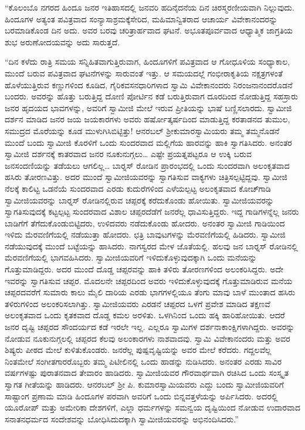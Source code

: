  “ಕೊಲಂಬೊ ನಗರದ ಹಿಂದೂ ಜನರ ಇತಿಹಾಸದಲ್ಲಿ ಜನವರಿ ಹದಿನೈದನೆಯ ದಿನ ಚಿರಸ್ಮರಣೀಯವಾಗಿ ನಿಲ್ಲುವುದು. ಹಿಂದೂಗಳ ಅತ್ಯಂತ ಪವಿತ್ರವಾದ ಸಂನ್ಯಾಸಾಶ್ರಮಕ್ಕೆ\break ಸೇರಿದ, ಮಹಿಮಾನ್ವಿತರಾದ ಆಚಾರ್ಯ ವಿವೇಕಾನಂದರನ್ನು ಬರಮಾಡಿಕೊಂಡ ದಿನ ಅದು. ಅವರ ಬರವು ಚರಿತ್ರಾರ್ಹವಾದ ಘಟನೆ. ಅಭೂತಪೂರ್ವವಾದ ಆಧ್ಯಾತ್ಮಿಕ ಜಾಗ್ರತಿಯ ಶುಭ ಅರುಣೋದಯವನ್ನು ಅದು ಸಾರುತ್ತದೆ. 

 “ದಿನ ಕಳೆದು ರಾತ್ರಿ ಸಮಯ ಸನ್ನಿಹಿತವಾಗುತ್ತಿರುವಾಗ, ಹಿಂದೂಗಳಿಗೆ ಪವಿತ್ರವಾದ ಆ ಗೋಧೂಳಿಯ ಸಂಧ್ಯಾಕಾಲ, ಮುಂದೆ ಬರುವ ಪವಿತ್ರವಾದ ಘಟನೆಗಳನ್ನು ಸಾರುವಂತೆ ಇತ್ತು. ಆ ಸಮಯದಲ್ಲೆ ಗಂಭೀರಾಕೃತಿಯ ನಕ್ಷತ್ರಗಳಂತೆ ಹೊಳೆಯುತ್ತಿರುವ ಕಣ್ಣುಗಳಿಂದ ಕೂಡಿದ, ಗೈರಿಕವಸನಧಾರಿಗಳಾದ ಸ್ವಾಮಿ ವಿವೇಕಾನಂದರು ನಿರಂಜನಾನಂದರೊಡನೆ ಬಂದರು. ಅವರನ್ನು ಹೊತ್ತು ಬರುತ್ತಿದ್ದ ದೋಣಿ ಪೋರ್ಟಿನ ಕಡೆ ಬರುತ್ತಿರುವಾಗ ದೂರದಿಂದ ನೋಡುತ್ತಿದ್ದ ಸಹಸ್ರಾರು ಜನರ ಹೃದಯದ ಭಾವಗಳನ್ನು, ಅವರಿಗೆ ಸ್ವಾಮೀಜಿ ಮೇಲೆ ಇರುವ ಪ್ರೀತಿಯನ್ನು ಭಾಷೆ ಬಣ್ಣಿಸಲಾರದು. ಸ್ವಾಮೀಜಿ ದರ್ಶನ ಮಾಡಿದ ಜನರ ಜಯ ಜಯಕಾರಗಳು ಅವರು ಹರ್ಷೋತ್ಕರ್ಷದಿಂದ ಮಾಡುತ್ತಿದ್ದ ಕರತಾಡನದ ತುಮುಲ, ಸಮುದ್ರದ ಮೊರೆಯನ್ನು ಕೂಡ ಮುಳುಗಿಸಿಬಿಟ್ಟಿತ್ತು! ಆನರಬಲ್ ಶ‍್ರೀಕುಮಾರಸ್ವಾಮಿಯರು ತಮ್ಮ ತಮ್ಮನೊಡನೆ ಮುಂದೆ ಬಂದು ಸ್ವಾಮೀಜಿ ಕೊರಳಿಗೆ ಒಂದು ಸುಂದರವಾದ ಮಲ್ಲಿಗೆಯ ಹಾರವನ್ನು ಹಾಕಿ ಸ್ವಾಗತಿಸಿದರು. ಅನಂತರ ಸ್ವಾಮೀಜಿ ದರ್ಶನಕ್ಕೆ ಕಾತರವಾದ ಜನರ ನೂಕುನುಗ್ಗಲು… ಎಷ್ಟೇ ಪ್ರಯತ್ನಪಟ್ಟರೂ ಆ ಉಕ್ಕಿ ಬರುವ ಜನಸಂದಣಿಯನ್ನು ತಡೆಯಲು ಆಗಲಿಲ್ಲ… ಬಾರ್‍ನಸ್ ರೋಡಿನ ಪ್ರಾರಂಭದಲ್ಲಿ ಒಂದು ಸುಂದರವಾಗಿ ಅಲಂಕೃತವಾದ ಹಸಿರು ತೋರಣವಿತ್ತು. ಅದರ ಮುಂದೆ ಸ್ವಾಮೀಜಿಯವರನ್ನು ಸ್ವಾಗತಿಸುವ ವಾಕ್ಯಗಳು ಚಿತ್ರಿಸಲ್ಪಟ್ಟಿದ್ದವು. ಸ್ವಾಮೀಜಿ ನೆಲಕ್ಕೆ ಕಾಲಿಟ್ಟ ಒಡನೆಯೆ ಸುಂದರವಾದ ಎರಡು ಕುದುರೆಗಳಿಂದ ಎಳೆಯಲ್ಪಟ್ಟ ಅಲಂಕೃತವಾದ ಕೋಚ್‍ಗಾಡಿ ಸ್ವಾಮೀಜಿಯವರನ್ನು ಬಾರ್‍ನಸ್ ರೋಡಿನಲ್ಲಿರುವ ಚಪ್ಪರಕ್ಕೆ ಕರೆದುಕೊಂಡು ಹೋಯಿತು. ಸ್ವಾಮೀಜಿಯವರನ್ನು ಸ್ವಾಗತಿಸುವುದಕ್ಕೆ ಕಟ್ಟಲ್ಪಟ್ಟ ಸುಂದರವಾದ ವಿಶಾಲ ಚಪ್ಪರದೆಡೆಗೆ ಜನರೆಲ್ಲ ಧಾವಿಸುತ್ತಿದ್ದರು. ಇದ್ದ ಗಾಡಿಗಳನ್ನೆಲ್ಲ ಜನರು ಬಾಡಿಗೆಗೆ ತೆಗೆದುಕೊಂಡುಬಿಟ್ಟಿದರು, ಉಳಿದವರು ನಡೆದುಕೊಂಡು ಹೋದರು. ಅನಂತರ ಸ್ವಾಮೀಜಿ ಗಾಡಿಯಿಂದ ಇಳಿದು ಮೆರವಣಿಗೆಯಲ್ಲಿ ನಡೆಯುತ್ತಾ ಹೋದರು. ಛತ್ರಿ ಬಾವುಟಗಳನ್ನು ಮೆರವಣಿಗೆಯಲ್ಲಿ ಹಿಡಿದರು. ಸ್ವಾಮೀಜಿ ನಡೆಯುವುದಕ್ಕೆ ಮುಂದೆ ಬಟ್ಟೆಯನ್ನು ಹಾಸಿದರು. ನಾಗಸ್ವರದ ಮೇಳ ಜೊತೆಯಲ್ಲಿ. ಹಲವು ಜನ ಬಾರ್‍ನಸ್ ರೋಡಿನಲ್ಲಿ ಮೆರವಣಿಗೆಯಲ್ಲಿ ಭಾಗವಹಿಸಿದರು. ಸ್ವಾಮೀಜಿಯವರಿಗೆ ಇಳಿದುಕೊಳ್ಳುವುದಕ್ಕಾಗಿ ಒಂದು ಮನೆಯನ್ನು ಗೊತ್ತುಮಾಡಿದ್ದರು. ಅದರ ಮುಂದೆ ದೊಡ್ಡ ಚಪ್ಪರವನ್ನು ಹಾಕಿ ತಳಿರು ತೋರಣಗಳಿಂದ ಅಲಂಕರಿಸಿದ್ದರು. ಅದೇ ಇವರನ್ನು ಸ್ವಾಗತಿಸುವ ಚಪ್ಪರ. ಮೊದಲನೇ ಚಪ್ಪರದಿಂದ ಅವರು ಇಳಿದುಕೊಳ್ಳುವುದಕ್ಕೆ ಗೊತ್ತುಮಾಡಿರುವ ಮನೆಯ ಚಪ್ಪರದವರೆಗೆ ಸುಮಾರು ಕಾಲು ಮೈಲಿ ದಾರಿಯ ಎರಡು ಭಾಗಗಳಲ್ಲಿಯೂ ತೆಂಗು ಮಾವು ಬಾಳೆ ಮುಂತಾದ ಹಸಿರು ತಳಿರುಗಳಿಂದ ಅಲಂಕರಿಸಲಾಗಿತ್ತು. ಸ್ವಾಮೀಜಿಯವರು ಎರಡನೆ ಚಪ್ಪರದ ಒಳಗೆ ಪ್ರವೇಶ ಮಾಡಿದ ತಕ್ಷಣವೆ ಅಲಂಕೃತವಾದ ಒಂದು ಕೃತಕವಾದ ದೊಡ್ಡ ಕಮಲ ಅರಳಿತು. ಒಳಗಿನಿಂದ ಒಂದು ಹಕ್ಕಿ ಹಾರಿಹೋಯಿತು. ಆದರೆ ಜನರ ದೃಷ್ಟಿ ಚಪ್ಪರದ ಸೌಂದರ್ಯದ ಕಡೆ ಇರಲೇ ಇಲ್ಲ. ಎಲ್ಲರೂ ಸ್ವಾಮಿಗಳ ದರ್ಶನಾಕಾಂಕ್ಷಿಗಳಾಗಿದ್ದರು. ಅವರನ್ನು ನೋಡುವ ನೂಕುನುಗ್ಗಲಲ್ಲಿ ಚಪ್ಪರದ ಕೆಲವು ಅಲಂಕಾರಗಳು ನಾಶವಾದವು. ಸ್ವಾಮಿ ವಿವೇಕಾನಂದರು ಮತ್ತು ಅವರ ಶಿಷ್ಯರು ಪೀಠದ ಮೇಲೆ ಕುಳಿತುಕೊಂಡರು. ಜನರೆಲ್ಲ ಪುಷ್ಪವೃಷ್ಟಿಯನ್ನು ಅವರ ಮೇಲೆ ಕರೆದರು. ಗದ್ದಲವೆಲ್ಲ ನಿಂತಮೇಲೆ ಸಂಗೀತಗಾರರೊಬ್ಬರು ತಮ್ಮ ಪಿಟೀಲಿನಲ್ಲಿ ಒಂದು ಹಾಡನ್ನು ನುಡಿಸಿದರು. ಅನಂತರ ಎರಡು ಸಾವಿರ ವರ್ಷಗಳಷ್ಟು ಪುರಾತನವಾದ ತೇವಾರಂ ಹಾಡಿದರು. ಸ್ವಾಮೀಜಿಯವರ ಗೌರವಾರ್ಥವಾಗಿ ರಚಿಸಿದ ಒಂದು ಸಂಸ್ಕೃತ ಸ್ವಾಗತ ಗೀತೆಯನ್ನು ಹಾಡಿದರು. ಆನರಬಲ್ ಶ‍್ರೀ ಪಿ. ಕುಮಾರಸ್ವಾಮಿಯವರು ಎದ್ದು ಬಂದು ಸ್ವಾಮೀಜಿಯವರಿಗೆ ಸಾಷ್ಟಾಂಗ ಪ್ರಣಾಮ ಮಾಡಿ ಹಿಂದೂಗಳ ಪರವಾಗಿ ಅವರಿಗೆ ಒಂದು ಬಿನ್ನವತ್ತಳೆಯನ್ನು ಅರ್ಪಿಸಿದರು. ಅದರಲ್ಲಿ ಯೂರೋಪ್ ಮತ್ತು ಅಮೇರಿಕಾ ದೇಶಗಳಿಗೆ, ಎಲ್ಲಾ ಧರ್ಮಗಳನ್ನು ಸಮನ್ವಯ ದೃಷ್ಟಿಯಿಂದ ನೋಡುವ ಉದಾರವಾದ ಸನಾತನಧರ್ಮದ ಸಂದೇಶವನ್ನು ಬೋಧಿಸಿದುದಕ್ಕಾಗಿ ಸ್ವಾಮೀಜಿಯವರನ್ನು ಅಭಿನಂದಿಸಿದರು.” 

